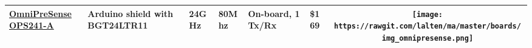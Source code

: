 \begin{longtable}[]{@{}llllllc@{}}
\begin{minipage}[t]{0.09\columnwidth}\raggedright\strut
	\href{https://www.omnipresense.com/product/ops241-a/}{OmniPreSense OPS241-A}
\strut\end{minipage} &
\begin{minipage}[t]{0.13\columnwidth}\raggedright\strut
Arduino shield with BGT24LTR11
\strut\end{minipage} &
\begin{minipage}[t]{0.09\columnwidth}\raggedright\strut
24GHz
\strut\end{minipage} &
\begin{minipage}[t]{0.11\columnwidth}\raggedright\strut
80Mhz
\strut\end{minipage} &
\begin{minipage}[t]{0.10\columnwidth}\raggedright\strut
On-board, 1 Tx/Rx
\strut\end{minipage} &
\begin{minipage}[t]{0.15\columnwidth}\raggedright\strut
\$169
\strut\end{minipage} &
\begin{minipage}[t]{0.10\columnwidth}\centering\strut
\texttt{[image: https://rawgit.com/lalten/ma/master/boards/img\_omnipresense.png]}
\strut\end{minipage}\tabularnewline

\bottomrule
\end{longtable}